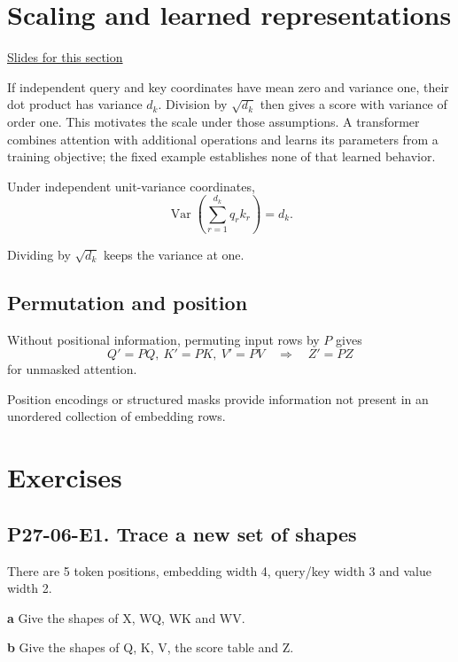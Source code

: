 \documentclass[11pt,letterpaper]{article}
\theoremstyle{definition}\newtheorem{definition}{Definition}\newtheorem{example}{Example}
\numberwithin{equation}{section}
\begin{document}
\section{Scaling and learned representations}
\hypertarget{note-scaling-and-learned-representations}{}\label{note:scaling-and-learned-representations}
{\small \href{slides.html\#frame=scaling-and-learned-representations\&step=1}{Slides for this section}}\par
If independent query and key coordinates have mean zero and variance one, their dot product has variance $d_k$. Division by $\sqrt{d_k}$ then gives a score with variance of order one. This motivates the scale under those assumptions. A transformer combines attention with additional operations and learns its parameters from a training objective; the fixed example establishes none of that learned behavior.

Under independent unit-variance coordinates,
\[
\operatorname{Var}\left(\sum_{r=1}^{d_k}q_rk_r\right)=d_k.
\]

Dividing by $\sqrt{d_k}$ keeps the variance at one.

\subsection*{Permutation and position}
Without positional information, permuting input rows by $P$ gives
\[
Q'=PQ,\ K'=PK,\ V'=PV\quad\Longrightarrow\quad Z'=PZ
\]
for unmasked attention.

Position encodings or structured masks provide information not present in an unordered collection of embedding rows.
\bigskip
\section*{Exercises}
\par\noindent\begin{minipage}{\linewidth}
\subsection*{P27-06-E1. Trace a new set of shapes}
There are 5 token positions, embedding width 4, query/key width 3 and value width 2.

\textbf{a} Give the shapes of X, WQ, WK and WV.

\end{minipage}\par\medskip
\textbf{b} Give the shapes of Q, K, V, the score table and Z.
\end{document}
